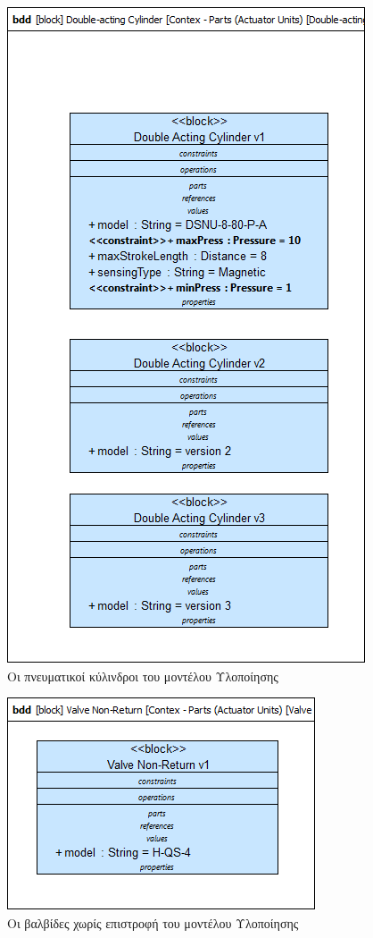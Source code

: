 \documentclass[a4paper,12pt,twoside]{report}
\begin{document}
{\begin{appendices}
				\begin{figure}[hp]
					\centering
					\includegraphics[scale=0.50]{DesignModel_Contex-Parts(ActuatorUnits)[Double-actingCylinder].png}
					\caption{Οι πνευματικοί κύλινδροι του μοντέλου Υλοποίησης}
					\label{φωτ:Οι πνευματικοί κύλινδροι του μοντέλου Υλοποίησης}
				\end{figure}
				
				\begin{figure}[hp]
					\centering
					\includegraphics[scale=0.50]{DesignModel_Contex-Parts(ActuatorUnits)[ValveNon-Return].png}
					\caption{Οι βαλβίδες χωρίς επιστροφή του μοντέλου Υλοποίησης}
					\label{φωτ:Οι βαλβίδες χωρίς επιστροφή του μοντέλου Υλοποίησης}
				\end{figure}
				

\end{appendices}}
\end{document}
